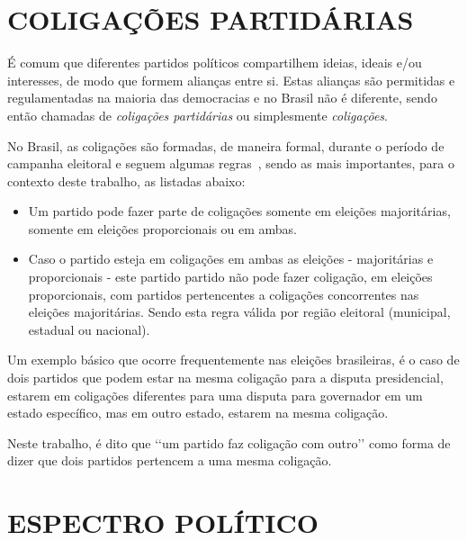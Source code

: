 
\section{\texorpdfstring{\MakeUppercase{Coligações Partidárias}}{}}
\label{conceitos__coligacoes}

É comum que diferentes partidos políticos compartilhem ideias, ideais e/ou interesses, de modo que formem alianças entre si. Estas alianças são permitidas e regulamentadas na maioria das democracias e no Brasil não é diferente, sendo então chamadas de \emph{coligações partidárias} ou simplesmente \emph{coligações}.

No Brasil, as coligações são formadas, de maneira formal, durante o período de campanha eleitoral e seguem algumas regras~\cite{brasil1997lei9504}, sendo as mais importantes, para o contexto deste trabalho, as listadas abaixo:

\begin{itemize}
    \item Um partido pode fazer parte de coligações somente em eleições majoritárias, somente em eleições proporcionais ou em ambas.
    \item Caso o partido esteja em coligações em ambas as eleições - majoritárias e proporcionais - este partido partido não pode fazer coligação, em eleições proporcionais, com partidos pertencentes a coligações concorrentes nas eleições majoritárias. Sendo esta regra válida por região eleitoral (municipal, estadual ou nacional).
\end{itemize}

Um exemplo básico que ocorre frequentemente nas eleições brasileiras, é o caso de dois partidos que podem estar na mesma coligação para a disputa presidencial, estarem em coligações diferentes para uma disputa para governador em um estado específico, mas em outro estado, estarem na mesma coligação.

Neste trabalho, é dito que ‘‘um partido faz coligação com outro’’ como forma de dizer que dois partidos pertencem a uma mesma coligação.


\section{\texorpdfstring{\MakeUppercase{Espectro Político}}{}}
\label{conceitos__espectro-politico}

